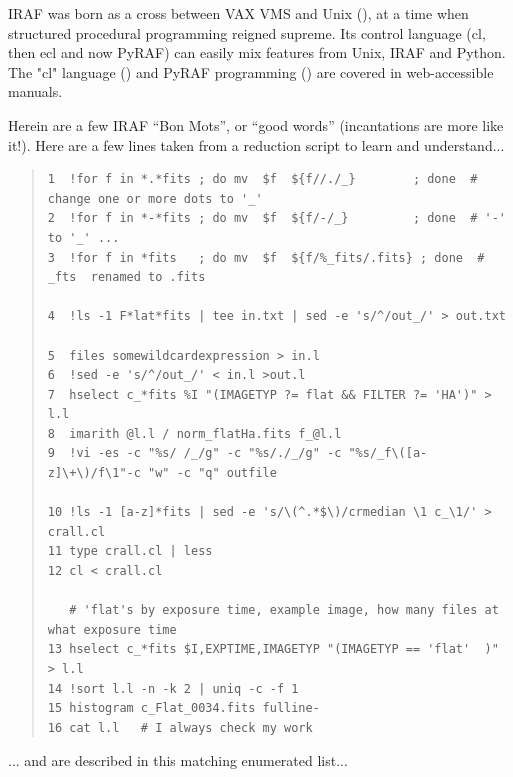 IRAF was born as a cross between VAX VMS and Unix
(\cite{1984BAAS...16..497V}), at a time when structured procedural
programming reigned supreme. Its control language (cl, then ecl and
now PyRAF) can easily mix features from Unix, IRAF and Python.
The "cl" language (\cite{CLProgrammersGuide}) and PyRAF programming
(\cite{PyrafProgrammersGuide}) are covered in web-accessible manuals.

Herein are a few IRAF ``Bon Mots'', or ``good words'' (incantations
are more like it!). Here are a few lines taken from a reduction script
to learn and understand...

{\color{verbcolor}
\begin{quote}
\begingroup \fontsize{8pt}{8pt}
\selectfont
\begin{verbatim}
1  !for f in *.*fits ; do mv  $f  ${f//./_}        ; done  # change one or more dots to '_'
2  !for f in *-*fits ; do mv  $f  ${f/-/_}         ; done  # '-' to '_' ...
3  !for f in *fits   ; do mv  $f  ${f/%_fits/.fits} ; done  # _fts  renamed to .fits

4  !ls -1 F*lat*fits | tee in.txt | sed -e 's/^/out_/' > out.txt

5  files somewildcardexpression > in.l
6  !sed -e 's/^/out_/' < in.l >out.l
7  hselect c_*fits %I "(IMAGETYP ?= flat && FILTER ?= 'HA')" > l.l
8  imarith @l.l / norm_flatHa.fits f_@l.l
9  !vi -es -c "%s/ /_/g" -c "%s/./_/g" -c "%s/_f\([a-z]\+\)/f\1"-c "w" -c "q" outfile

10 !ls -1 [a-z]*fits | sed -e 's/\(^.*$\)/crmedian \1 c_\1/' > crall.cl
11 type crall.cl | less
12 cl < crall.cl

   # 'flat's by exposure time, example image, how many files at what exposure time
13 hselect c_*fits $I,EXPTIME,IMAGETYP "(IMAGETYP == 'flat'  )" > l.l
14 !sort l.l -n -k 2 | uniq -c -f 1
15 histogram c_Flat_0034.fits fulline-
16 cat l.l   # I always check my work
\end{verbatim}
\endgroup
\end{quote}
}

... and are described in this matching enumerated list...

